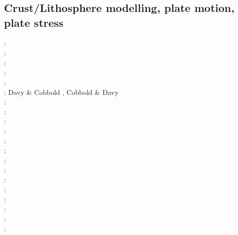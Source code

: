 \subsection{Crust/Lithosphere modelling, plate motion, plate stress}

\begin{scriptsize}
\nineteenseventyseven: \cite{crou77}\\
\nineteeneightyone: \cite{brpo81}\\
\nineteeneightythree: \cite{mcja83}\\
\nineteeneightyfour: \cite{kupa84}\cite{riff84}\\
\nineteeneightysix: \cite{stbb86}\\
\nineteeneightyeight: Davy \& Cobbold \cite{daco88}, Cobbold \& Davy \cite{coda88}\\
\nineteeneightynine: \cite{jabe89}\\
\nineteenninety: \cite{chmo90}\\
\nineteenninetyone: \cite{chbv91}\cite{daco91}\\
\nineteenninetytwo: \cite{moln92}\cite{budi92}\cite{kigw92}\\
\nineteenninetythree: \cite{nefo93}\cite{brau93}\cite{grma93}\cite{berc93}\\
\nineteenninetyfour: \cite{buso94}\cite{befh94}\\
\nineteenninetyfive: \cite{belg95}\cite{brbe95}\cite{kian95}\cite{budi95}\cite{elfb95}\cite{zhgu95b}\\
\nineteenninetysix: \cite{bekh96}\cite{berc96}\cite{jabh96}\\
\nineteenninetyseven: \cite{thsj97}\cite{babr97}\cite{bucl97}\cite{mole97}\\
\nineteenninetyeight: \cite{bird98}\cite{lecd98}\cite{kian98}\cite{mafs98}\cite{madu98}\cite{gumm98}\cite{berc98}\cite{madu98}\\
\nineteenninetynine: \cite{will99b}\cite{bird99}\cite{clbp99}\cite{fugo99}\cite{mole99}\cite{lemo99}\cite{gebp99}\\
\twothousand: \cite{hanl00}\cite{labp00}\cite{lemm00}\cite{gumm00}\cite{lemo00}\cite{pepo00}\cite{scys00b}\\
\twothousandone: \cite{homo01}\cite{beoc01}\cite{kapo01}\\
\twothousandtwo: \cite{labu02}\cite{coli02}\cite{bast02}\cite{gedh02}\cite{kilg02}\\

\end{scriptsize}
